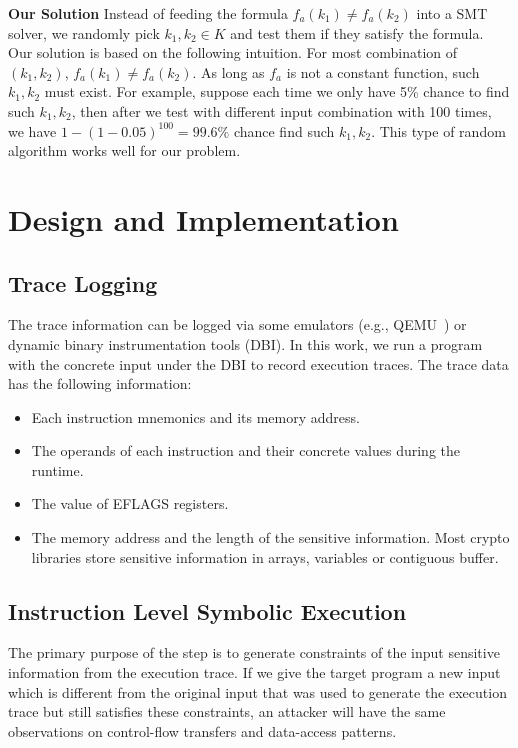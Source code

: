 \textbf{Our Solution}
Instead of feeding the formula $f_a(k_1) \neq f_a(k_2)$ into a SMT solver, we
randomly pick $k_1, k_2 \in K$ and test them if they satisfy the
formula. Our solution is based on the following intuition. For most combination
of $(k_{1}, k_{2} )$, $f_a(k_1) \neq f_a(k_2)$. As long as
$f_a$ is not a constant function, such $k_1, k_2$ must exist. For example,
suppose each time we only have 5\% chance to find such $k_1, k_2$, then after we
test with different input combination with 100 times, we have $1 -
  (1-0.05)^{100} = 99.6\%$ chance find such $k_1, k_2$. This type of random algorithm works well for our problem.

\section{Design and Implementation}
\subsection{Trace Logging}
The trace information can be logged via some emulators (e.g., QEMU~\cite{bellard2005qemu}) or dynamic binary instrumentation tools (DBI).
In this work, we run a program with the concrete input under the DBI to record execution traces.
The trace data has the following information:
\begin{itemize}
  \item Each instruction mnemonics and its memory address.
  \item The operands of each instruction and their concrete values during the runtime.
  \item The value of EFLAGS registers.
  \item The memory address and the length of the sensitive information.
        Most crypto libraries store sensitive information in arrays,
        variables or contiguous buffer.
\end{itemize}

\subsection{Instruction Level Symbolic Execution}
\label{InstructionSE}
The primary purpose of the step is to generate constraints of the input sensitive information from the execution trace. If we give the target program a new input which is different from the original input that was used to generate the execution trace but still satisfies these constraints, an attacker will have the same observations on control-flow transfers and data-access patterns.

